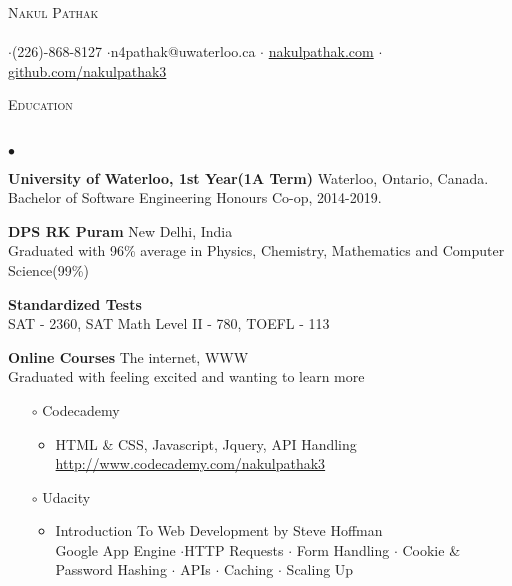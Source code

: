 \documentclass{article}
\newcommand{\lineunder}{\vspace*{-8pt} \\ \hspace*{-18pt} \hrulefill \\}
\newcommand{\header}[1]{{\hspace*{-15pt}\vspace*{6pt} \textsc{#1}} \vspace*{-6pt} \lineunder}
\newenvironment{achievements}{\begin{list}{$\bullet$}{\topsep 0pt \itemsep -1.5pt \leftmargin 5pt}}{\vspace*{4pt}\end{list}}
\begin{document}
\small
\smallskip
\vspace*{-45pt}

\begin{center}
	{\huge \scshape {Nakul Pathak}} \\
	\hrulefill \\
	\vspace{-9pt}
\flushleft$\cdot$(226)-868-8127 \hspace{1.75cm}$\cdot$n4pathak@uwaterloo.ca \hspace{1.75cm} $\cdot$ \url{nakulpathak.com} \hspace{1.75cm} $\cdot$ \url{github.com/nakulpathak3}
\end{center}

\vspace{10pt}
\header{Education}
\begin{achievements}
\item \textbf{University of Waterloo, 1st Year(1A Term)} Waterloo, Ontario, Canada. \\ Bachelor of Software Engineering Honours Co-op, 2014-2019. 
\item \textbf{DPS RK Puram} New Delhi, India \\ Graduated with 96\% average in Physics, Chemistry, Mathematics and Computer Science(99\%)
\item \textbf{Standardized Tests} \\ SAT - 2360, SAT Math Level II - 780, TOEFL - 113
\item \textbf{Online Courses} The internet, WWW \\ Graduated with feeling excited and wanting to learn more
\vspace{-4pt}
\begin{itemize}
	\item[$\circ$] Codecademy
	\begin{itemize}
	\vspace{-2pt}
	\item HTML \& CSS, Javascript, Jquery, API Handling 
	\\ \url{http://www.codecademy.com/nakulpathak3}
	\end{itemize}
	\vspace{-3.5pt}
\item[$\circ$] Udacity
	\begin{itemize}
	\vspace{-2pt}
	\item Introduction To Web Development by Steve Hoffman 
	\\  Google App Engine $\cdot$HTTP Requests  $\cdot$ Form Handling $\cdot$ Cookie \& Password Hashing $\cdot$ APIs $\cdot$ Caching $\cdot$ Scaling Up

\end{itemize}
\end{itemize}
\end{achievements}
\end{document}
